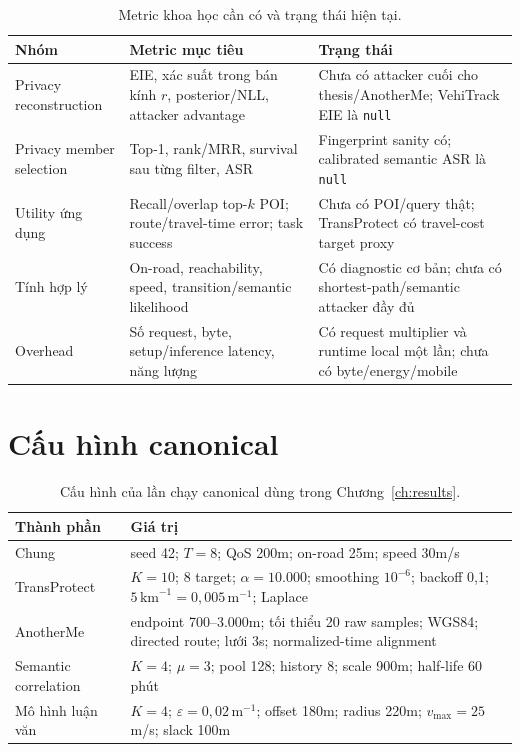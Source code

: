 \documentclass[12pt,a4paper,oneside]{report}
\begin{document}
\begin{table}[htbp]
\centering
\small
\caption{Metric khoa học cần có và trạng thái hiện tại.}
\label{tab:metric-status}
\begin{tabularx}{\textwidth}{P{3.0cm}P{4.0cm}Y}
\toprule
\textbf{Nhóm} & \textbf{Metric mục tiêu} & \textbf{Trạng thái} \\
\midrule
Privacy reconstruction & EIE, xác suất trong bán kính $r$, posterior/NLL, attacker advantage & Chưa có attacker cuối cho thesis/AnotherMe; VehiTrack EIE là \texttt{null} \\
Privacy member selection & Top-1, rank/MRR, survival sau từng filter, ASR & Fingerprint sanity có; calibrated semantic ASR là \texttt{null} \\
Utility ứng dụng & Recall/overlap top-$k$ POI; route/travel-time error; task success & Chưa có POI/query thật; TransProtect có travel-cost target proxy \\
Tính hợp lý & On-road, reachability, speed, transition/semantic likelihood & Có diagnostic cơ bản; chưa có shortest-path/semantic attacker đầy đủ \\
Overhead & Số request, byte, setup/inference latency, năng lượng & Có request multiplier và runtime local một lần; chưa có byte/energy/mobile \\
\bottomrule
\end{tabularx}
\end{table}

\section{Cấu hình canonical}

\begin{table}[htbp]
\centering
\footnotesize
\caption{Cấu hình của lần chạy canonical dùng trong Chương~\ref{ch:results}.}
\label{tab:canonical-config}
\begin{tabularx}{\textwidth}{P{4.1cm}Y}
\toprule
\textbf{Thành phần} & \textbf{Giá trị} \\
\midrule
Chung & seed 42; $T=8$; QoS 200m; on-road 25m; speed 30m/s \\
TransProtect & $K=10$; 8 target; $\alpha=10.000$; smoothing $10^{-6}$; backoff 0,1; $5\,\mathrm{km}^{-1}=0{,}005\,\mathrm{m}^{-1}$; Laplace \\
AnotherMe & endpoint 700--3.000m; tối thiểu 20 raw samples; WGS84; directed route; lưới 3s; normalized-time alignment \\
Semantic correlation & $K=4$; $\mu=3$; pool 128; history 8; scale 900m; half-life 60 phút \\
Mô hình luận văn & $K=4$; $\varepsilon=0{,}02\,\mathrm{m}^{-1}$; offset 180m; radius 220m; $v_{\max}=25$m/s; slack 100m \\
\bottomrule
\end{tabularx}
\end{table}
\end{document}
